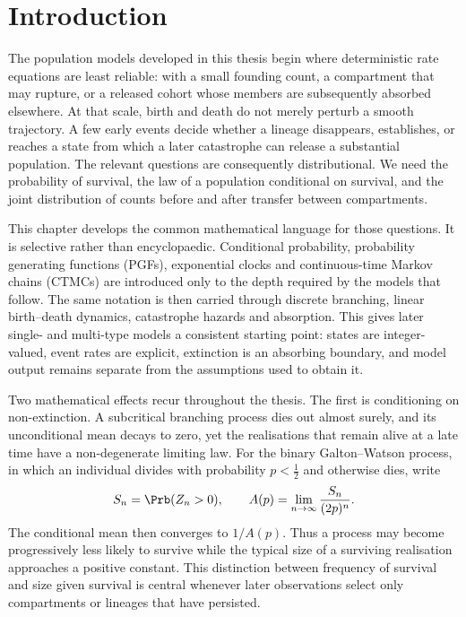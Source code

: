 \section{Introduction}
\label{sec:intro}

The population models developed in this thesis begin where deterministic rate
equations are least reliable: with a small founding count, a compartment that may
rupture, or a released cohort whose members are subsequently absorbed elsewhere.
At that scale, birth and death do not merely perturb a smooth trajectory.  A few
early events decide whether a lineage disappears, establishes, or reaches a state
from which a later catastrophe can release a substantial population.  The relevant
questions are consequently distributional.  We need the probability of survival,
the law of a population conditional on survival, and the joint distribution of
counts before and after transfer between compartments.

This chapter develops the common mathematical language for those questions.  It is
selective rather than encyclopaedic.  Conditional probability, probability
generating functions (PGFs), exponential clocks and continuous-time Markov chains
(CTMCs) are introduced only to the depth required by the models that follow.  The
same notation is then carried through discrete branching, linear birth--death
dynamics, catastrophe hazards and absorption.  This gives later single- and
multi-type models a consistent starting point: states are integer-valued, event
rates are explicit, extinction is an absorbing boundary, and model output remains
separate from the assumptions used to obtain it.

Two mathematical effects recur throughout the thesis.  The first is conditioning
on non-extinction.  A subcritical branching process dies out almost surely, and its
unconditional mean decays to zero, yet the realisations that remain alive at a late
time have a non-degenerate limiting law.  For the binary Galton--Watson process,
in which an individual divides with probability \(p<\tfrac12\) and otherwise dies,
write
\[
  S_n=\Prb(Z_n>0),
  \qquad
  A(p)=\lim_{n\to\infty}\frac{S_n}{(2p)^n}.
\]
The conditional mean then converges to \(1/A(p)\).  Thus a process may become
progressively less likely to survive while the typical size of a surviving
realisation approaches a positive constant.  This distinction between frequency
of survival and size given survival is central whenever later observations select
only compartments or lineages that have persisted.

